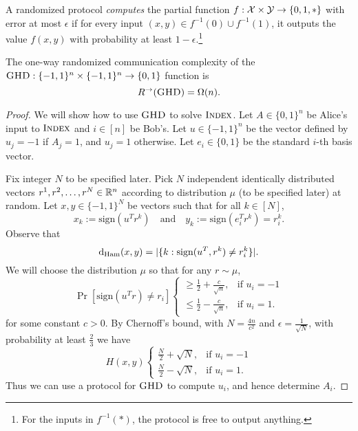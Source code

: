 \begin{definition}
A randomized protocol \emph{computes} the partial function $f : \mathcal{X} \times \mathcal{Y} \to \{0,1,*\}$ with error at most $\epsilon$ if for every input $(x,y) \in f^{-1}(0) \cup f^{-1}(1)$, it outputs the value $f(x,y)$ with probability at least $1-\epsilon$.\footnote{For the inputs in $f^{-1}(*)$, the protocol is free to output anything.}
\end{definition}

\begin{theorem}
The one-way randomized communication complexity of the $\textsc{GHD} : \{-1,1\}^n \times \{-1,1\}^n \to \{0,1\}$ function is
\[
R^\rightarrow(\textsc{GHD}) = \Omega(n).
\]
\end{theorem}

\begin{proof}
We will show how to use $\textsc{GHD}$ to solve $\textsc{Index}$. Let $A\in \{0,1\}^n$ be Alice's input to $\textsc{Index}$ and $i \in [n]$ be Bob's. Let $u \in \{-1,1\}^n$ be the vector defined by $u_j = -1$ if $A_j = 1$, and $u_j = 1$ otherwise. Let $e_i \in \{0,1\}$ be the standard $i$-th basis vector.

Fix integer $N$ to be specified later. Pick $N$ independent identically distributed vectors $r^1,r^2,\dots, r^N \in \mathbb{R}^n$ according to distribution $\mu$ (to be specified later) at random. Let $x, y\in\{-1,1\}^N$ be vectors such that for all $k \in [N]$,
$$x_k := \text{sign}(u^Tr^k)\quad\text{and}\quad y_k := \text{sign}(e_i^Tr^k) = r^k_i.$$
Observe that
$$\mathrm{d}_{\mathrm{Ham}}(x,y)= |\{k:\text{sign}(u^T,r^k)\neq r^k_i\}|.$$
We will choose the distribution $\mu$ so that for any $r\sim \mu$,
\begin{equation}\label{eq:prob}\Pr[\text{sign}(u^Tr)\neq r_i] \begin{cases}
\geq \frac{1}{2} + \frac{c}{\sqrt{n}}, &\text{if }u_i=-1 \\
\leq \frac{1}{2}-\frac{c}{\sqrt{n}}, &\text{if }u_i=1.
\end{cases}\end{equation}
for some constant $c>0$. By Chernoff's bound, with $N =\frac{4n}{c^2}$ and $\epsilon = \frac{1}{\sqrt{N}}$, with probability at least $\frac{2}{3}$ we have 
$$H(x,y) \begin{cases}
\frac{N}{2} + \sqrt{N}, &\text{if } u_i = -1 \\
\frac{N}{2} - \sqrt{N}, &\text{if } u_i = 1.
\end{cases}$$
Thus we can use a protocol for $\textsc{GHD}$ to compute $u_i$, and hence determine $A_i$.


\end{proof}
